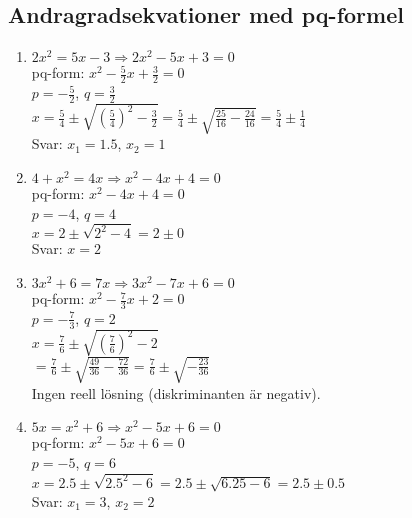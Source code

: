 \documentclass[a4paper,11pt]{article}
\begin{document}
\subsection*{Andragradsekvationer med pq-formel}
\begin{enumerate}[label=\textbf{\arabic*.}]
    \item $2x^2 = 5x - 3 \Rightarrow 2x^2 - 5x + 3 = 0$\\
    pq-form: $x^2 - \frac{5}{2}x + \frac{3}{2} = 0$\\
    $p = -\frac{5}{2}$, $q = \frac{3}{2}$\\
    $x = \frac{5}{4} \pm \sqrt{\left(\frac{5}{4}\right)^2 - \frac{3}{2}} = \frac{5}{4} \pm \sqrt{\frac{25}{16} - \frac{24}{16}} = \frac{5}{4} \pm \frac{1}{4}$\\
    Svar: $x_1 = 1.5$, $x_2 = 1$
    \item $4 + x^2 = 4x \Rightarrow x^2 - 4x + 4 = 0$\\
    pq-form: $x^2 - 4x + 4 = 0$\\
    $p = -4$, $q = 4$\\
    $x = 2 \pm \sqrt{2^2 - 4} = 2 \pm 0$\\
    Svar: $x = 2$
    \item $3x^2 + 6 = 7x \Rightarrow 3x^2 - 7x + 6 = 0$\\
    pq-form: $x^2 - \frac{7}{3}x + 2 = 0$\\
    $p = -\frac{7}{3}$, $q = 2$\\
    $x = \frac{7}{6} \pm \sqrt{\left(\frac{7}{6}\right)^2 - 2}$\\
    $= \frac{7}{6} \pm \sqrt{\frac{49}{36} - \frac{72}{36}} = \frac{7}{6} \pm \sqrt{-\frac{23}{36}}$\\
    Ingen reell lösning (diskriminanten är negativ).
    \item $5x = x^2 + 6 \Rightarrow x^2 - 5x + 6 = 0$\\
    pq-form: $x^2 - 5x + 6 = 0$\\
    $p = -5$, $q = 6$\\
    $x = 2.5 \pm \sqrt{2.5^2 - 6} = 2.5 \pm \sqrt{6.25 - 6} = 2.5 \pm 0.5$\\
    Svar: $x_1 = 3$, $x_2 = 2$
\end{enumerate}
\end{document}
